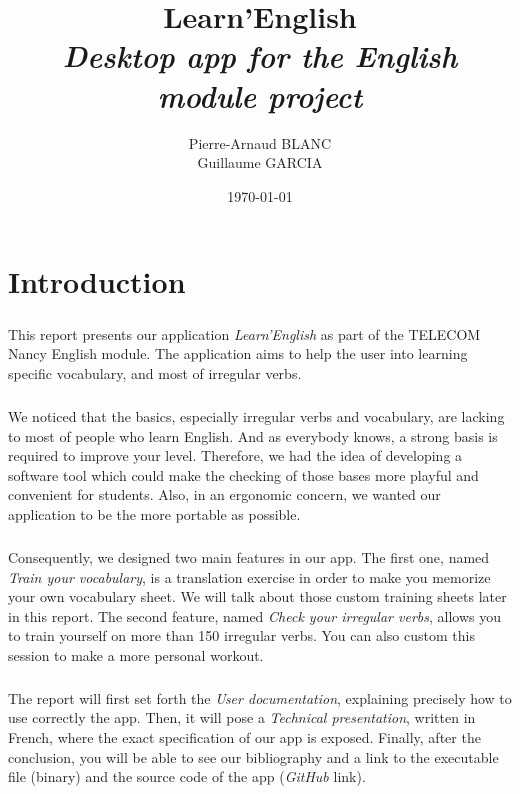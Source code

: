\documentclass[12pt, a4paper]{report}
\title{\textcolor{BrickRed}
    {\Huge Learn'English}\\ 
    \large \textit{Desktop app for the English module project}}
\author{Pierre-Arnaud BLANC \\ Guillaume GARCIA}
\date{\today}
\begin{document}
\maketitle
\hypersetup{linkcolor=blue}


\tableofcontents

\newpage
\chapter*{Introduction}

\paragraph{}This report presents our application \textit{Learn'English} as part of the TELECOM Nancy English module. The application aims to help the user into learning specific vocabulary, and most of irregular verbs.

\paragraph{}We noticed that the basics, especially irregular verbs and vocabulary, are lacking to most of people who learn English. And as everybody knows, a strong basis is required to improve your level. Therefore, we had the idea of developing a software tool which could make the checking of those bases more playful and convenient for students. Also, in an ergonomic concern, we wanted our application to be the more portable as possible.

\paragraph{}Consequently, we designed two main features in our app. The first one, named \textit{Train your vocabulary}, is a translation exercise in order to make you memorize your own vocabulary sheet. We will talk about those custom training sheets later in this report. The second feature, named \textit{Check your irregular verbs}, allows you to train yourself on more than 150 irregular verbs. You can also custom this session to make a more personal workout.

\paragraph{}The report will first set forth the \textit{User documentation}, explaining precisely how to use correctly the app. Then, it will pose a \textit{Technical presentation}, written in French, where the exact specification of our app is exposed. Finally, after the conclusion, you will be able to see our bibliography and a link to the executable file (binary) and the source code of the app (\textit{GitHub} link).
\end{document}
